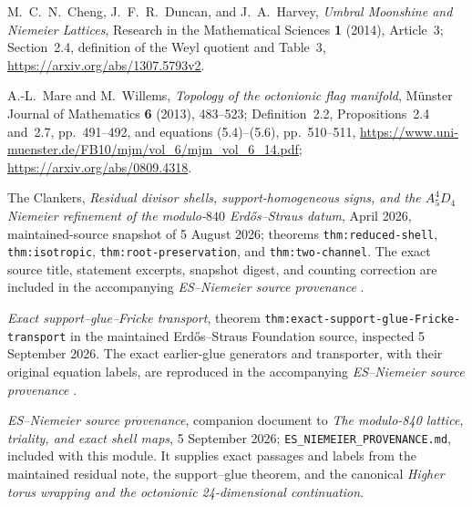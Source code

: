 
M.~C.~N.~Cheng, J.~F.~R.~Duncan, and J.~A.~Harvey,
\emph{Umbral Moonshine and Niemeier Lattices},
Research in the Mathematical Sciences \textbf{1} (2014), Article~3;
Section~2.4, definition of the Weyl quotient and Table~3,
\url{https://arxiv.org/abs/1307.5793v2}.

A.-L.~Mare and M.~Willems,
\emph{Topology of the octonionic flag manifold},
M\"unster Journal of Mathematics \textbf{6} (2013), 483--523;
Definition~2.2, Propositions~2.4 and~2.7, pp.~491--492,
and equations (5.4)--(5.6), pp.~510--511,
\url{https://www.uni-muenster.de/FB10/mjm/vol_6/mjm_vol_6_14.pdf};
\url{https://arxiv.org/abs/0809.4318}.

The Clankers,
\emph{Residual divisor shells, support-homogeneous signs, and the
\(A_5^4D_4\) Niemeier refinement of the modulo-\(840\)
Erd\H{o}s--Straus datum},
April 2026, maintained-source snapshot of 5 August 2026;
theorems \texttt{thm:reduced-shell}, \texttt{thm:isotropic},
\texttt{thm:root-preservation}, and \texttt{thm:two-channel}.
The exact source title, statement excerpts, snapshot digest, and
counting correction are included in the accompanying
\emph{ES--Niemeier source provenance} \cite{esn:Provenance}.

\emph{Exact support--glue--Fricke transport},
theorem \nolinkurl{thm:exact-support-glue-Fricke-transport}
in the maintained Erd\H{o}s--Straus Foundation source,
inspected 5 September 2026.
The exact earlier-glue generators and transporter, with their original
equation labels, are reproduced in the accompanying
\emph{ES--Niemeier source provenance} \cite{esn:Provenance}.

\emph{ES--Niemeier source provenance},
companion document to \emph{The modulo-840 lattice, triality, and exact
shell maps}, 5 September 2026;
\nolinkurl{ES_NIEMEIER_PROVENANCE.md}, included with this module.
It supplies exact passages and labels from the maintained residual
note, the support--glue theorem, and the canonical
\emph{Higher torus wrapping and the octonionic 24-dimensional continuation}.
